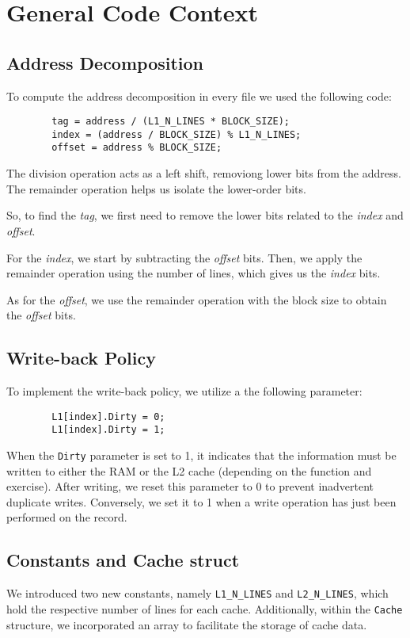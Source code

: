 \documentclass[12pt]{article}
\begin{document}
    \section{General Code Context}
    
    \subsection{Address Decomposition}
    To compute the address decomposition in every file we used the following code:

    \begin{verbatim}
        tag = address / (L1_N_LINES * BLOCK_SIZE);
        index = (address / BLOCK_SIZE) % L1_N_LINES;
        offset = address % BLOCK_SIZE;
    \end{verbatim}

    The division operation acts as a left shift, removiong lower bits from the address. The remainder operation helps us 
     isolate the lower-order bits.

    So, to find the \textit{tag}, we first need to remove the lower bits related to the \textit{index} and \textit{offset}. 
    
    For the \textit{index}, we start by subtracting the \textit{offset} bits. Then, we apply the remainder operation using the number of lines, 
     which gives us the \textit{index} bits.
     
    As for the \textit{offset}, we use the remainder operation with the block size to obtain the \textit{offset} bits.

    \subsection{Write-back Policy}
    To implement the write-back policy, we utilize a the following parameter:

    \begin{verbatim}
        L1[index].Dirty = 0;
        L1[index].Dirty = 1;
    \end{verbatim}

    When the \texttt{Dirty} parameter is set to 1, it indicates that the information must be written to either the RAM or the L2 cache (depending on the function and exercise).
     After writing, we reset this parameter to 0 to prevent inadvertent duplicate writes. Conversely, we set it to 1 when a write operation has just been performed on 
     the record.

    \subsection{Constants and Cache struct}
    We introduced two new constants, namely \texttt{L1\_N\_LINES} and \texttt{L2\_N\_LINES}, which hold the respective number of lines for each cache. Additionally,
     within the \texttt{Cache} structure, we incorporated an array to facilitate the storage of cache data.
\end{document}
